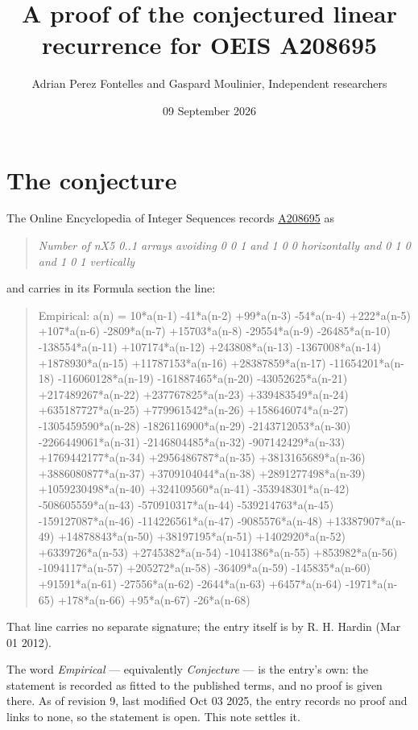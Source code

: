 \documentclass[11pt]{article}
\title{A proof of the conjectured linear recurrence for OEIS A208695}
\author{Adrian Perez Fontelles and Gaspard Moulinier, Independent researchers}
\date{09 September 2026}
\theoremstyle{definition}
\begin{document}
\maketitle
\section{The conjecture}

The Online Encyclopedia of Integer Sequences records \href{https://oeis.org/A208695}{A208695} as

\begin{quote}\itshape Number of nX5 0..1 arrays avoiding 0 0 1 and 1 0 0 horizontally and 0 1 0 and 1 0 1 vertically\end{quote}

and carries in its Formula section the line:

\begin{quote}\ttfamily Empirical: a(n) = 10*a(n-1) -41*a(n-2) +99*a(n-3) -54*a(n-4) +222*a(n-5) +107*a(n-6) -2809*a(n-7) +15703*a(n-8) -29554*a(n-9) -26485*a(n-10) -138554*a(n-11) +107174*a(n-12) +243808*a(n-13) -1367008*a(n-14) +1878930*a(n-15) +11787153*a(n-16) +28387859*a(n-17) -11654201*a(n-18) -116060128*a(n-19) -161887465*a(n-20) -43052625*a(n-21) +217489267*a(n-22) +237767825*a(n-23) +339483549*a(n-24) +635187727*a(n-25) +779961542*a(n-26) +158646074*a(n-27) -1305459590*a(n-28) -1826116900*a(n-29) -2143712053*a(n-30) -2266449061*a(n-31) -2146804485*a(n-32) -907142429*a(n-33) +1769442177*a(n-34) +2956486787*a(n-35) +3813165689*a(n-36) +3886080877*a(n-37) +3709104044*a(n-38) +2891277498*a(n-39) +1059230498*a(n-40) +324109560*a(n-41) -353948301*a(n-42) -508605559*a(n-43) -570910317*a(n-44) -539214763*a(n-45) -159127087*a(n-46) -114226561*a(n-47) -9085576*a(n-48) +13387907*a(n-49) +14878843*a(n-50) +38197195*a(n-51) +1402920*a(n-52) +6339726*a(n-53) +2745382*a(n-54) -1041386*a(n-55) +853982*a(n-56) -1094117*a(n-57) +205272*a(n-58) -36409*a(n-59) -145835*a(n-60) +91591*a(n-61) -27556*a(n-62) -2644*a(n-63) +6457*a(n-64) -1971*a(n-65) +178*a(n-66) +95*a(n-67) -26*a(n-68)\end{quote}

That line carries no separate signature; the entry itself is by R. H. Hardin (Mar 01 2012).

The word {\itshape Empirical} --- equivalently {\itshape Conjecture} --- is the entry's own: the statement is recorded as fitted to the published terms, and no proof is given there. As of revision 9, last modified Oct 03 2025, the entry records no proof and links to none, so the statement is open. This note settles it.
\end{document}
